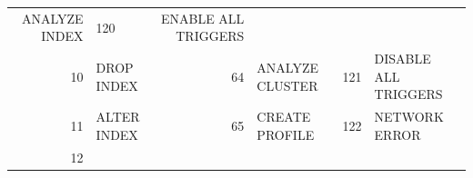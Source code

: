 \begin{appendix}
\begin{longtable}[]{@{}rl|rl|rl@{}}
\begin{minipage}[t]{0.24\columnwidth}
ANALYZE INDEX\strut
\end{minipage} & \begin{minipage}[t]{0.06\columnwidth}\raggedright\strut
120\strut
\end{minipage} & \begin{minipage}[t]{0.24\columnwidth}\raggedright\strut
ENABLE ALL TRIGGERS\strut
\end{minipage}\tabularnewline
\begin{minipage}[t]{0.06\columnwidth}\raggedright\strut
10\strut
\end{minipage} & \begin{minipage}[t]{0.19\columnwidth}\raggedright\strut
DROP INDEX\strut
\end{minipage} & \begin{minipage}[t]{0.06\columnwidth}\raggedright\strut
64\strut
\end{minipage} & \begin{minipage}[t]{0.24\columnwidth}\raggedright\strut
ANALYZE CLUSTER\strut
\end{minipage} & \begin{minipage}[t]{0.06\columnwidth}\raggedright\strut
121\strut
\end{minipage} & \begin{minipage}[t]{0.24\columnwidth}\raggedright\strut
DISABLE ALL TRIGGERS\strut
\end{minipage}\tabularnewline
\begin{minipage}[t]{0.06\columnwidth}\raggedright\strut
11\strut
\end{minipage} & \begin{minipage}[t]{0.19\columnwidth}\raggedright\strut
ALTER INDEX\strut
\end{minipage} & \begin{minipage}[t]{0.06\columnwidth}\raggedright\strut
65\strut
\end{minipage} & \begin{minipage}[t]{0.24\columnwidth}\raggedright\strut
CREATE PROFILE\strut
\end{minipage} & \begin{minipage}[t]{0.06\columnwidth}\raggedright\strut
122\strut
\end{minipage} & \begin{minipage}[t]{0.24\columnwidth}\raggedright\strut
NETWORK ERROR\strut
\end{minipage}\tabularnewline
\begin{minipage}[t]{0.06\columnwidth}\raggedright\strut
12\strut
\end{minipage} & \begin{minipage}[t]{0.19\columnwidth}\raggedright\strut

\end{minipage}
\end{longtable}
\end{appendix}
